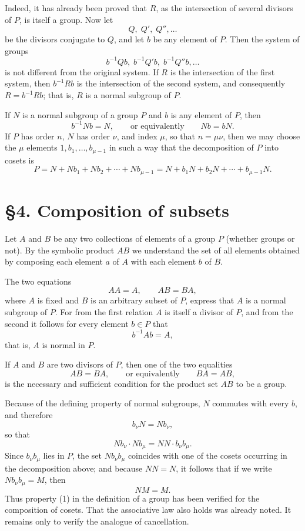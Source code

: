 \documentclass[11pt]{article}
\begin{document}
Indeed, it has already been proved that $R$, as the intersection of several divisors of $P$, is itself a group. Now let
\[
 Q,\;Q',\;Q'',\dots
\]
be the divisors conjugate to $Q$, and let $b$ be any element of $P$. Then the system of groups
\[
 b^{-1}Qb,\; b^{-1}Q'b,\; b^{-1}Q''b,\dots
\]
is not different from the original system. If $R$ is the intersection of the first system, then $b^{-1}Rb$ is the intersection of the second system, and consequently $R=b^{-1}Rb$; that is, $R$ is a normal subgroup of $P$.

If $N$ is a normal subgroup of a group $P$ and $b$ is any element of $P$, then
\[
 b^{-1} N b = N,
 \qquad\text{or equivalently}\qquad
 N b = b N.
\]
If $P$ has order $n$, $N$ has order $\nu$, and index $\mu$, so that $n=\mu\nu$, then we may choose the $\mu$ elements $1,b_1,\dots,b_{\mu-1}$ in such a way that the decomposition of $P$ into cosets is
\[
 P = N + N b_1 + N b_2 + \cdots + N b_{\mu-1}
   = N + b_1 N + b_2 N + \cdots + b_{\mu-1} N.
\]

\section*{§4. Composition of subsets}
Let $A$ and $B$ be any two collections of elements of a group $P$ (whether groups or not). By the symbolic product $AB$ we understand the set of all elements obtained by composing each element $a$ of $A$ with each element $b$ of $B$.

The two equations
\[
 AA = A,
 \qquad
 AB = BA,
\]
where $A$ is fixed and $B$ is an arbitrary subset of $P$, express that $A$ is a normal subgroup of $P$. For from the first relation $A$ is itself a divisor of $P$, and from the second it follows for every element $b\in P$ that
\[
 b^{-1} A b = A,
\]
that is, $A$ is normal in $P$.

If $A$ and $B$ are two divisors of $P$, then one of the two equalities
\[
 AB = BA,
 \qquad\text{or equivalently}\qquad
 BA = AB,
\]
is the necessary and sufficient condition for the product set $AB$ to be a group.

Because of the defining property of normal subgroups, $N$ commutes with every $b$, and therefore
\[
 b_\nu N = N b_\nu,
\]
so that
\[
 N b_\nu \cdot N b_\mu = N N \cdot b_\nu b_\mu.
\]
Since $b_\nu b_\mu$ lies in $P$, the set $N b_\nu b_\mu$ coincides with one of the cosets occurring in the decomposition above; and because $N N = N$, it follows that if we write $N b_\nu b_\mu = M$, then
\[
 N M = M.
\]
Thus property (1) in the definition of a group has been verified for the composition of cosets. That the associative law also holds was already noted. It remains only to verify the analogue of cancellation.
\end{document}
